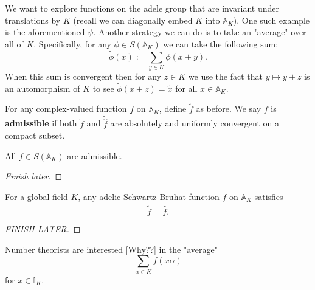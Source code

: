 \documentclass[11pt, x11names]{book}
\renewcommand{\aa}{\mathbb{A}}
\newcommand{\ii}{\mathbb{I}}
\renewcommand{\hat}{\widehat}
\begin{document}
We want to explore functions on the adele group that are invariant under translations by $K$ (recall we can diagonally embed $K$ into $\aa_K$). One such example is the aforementioned $\psi$. Another strategy we can do is to take an "average" over all of $K$. Specifically, for any $\phi \in S(\aa_K)$ we can take the following sum:
\begin{equation*}
    \widetilde{\phi}(x) := \sum_{y \in K} \phi(x + y).
\end{equation*}
When this sum is convergent then for any $z \in K$ we use the fact that $y \mapsto y + z$ is an automorphism of $K$ to see $\widetilde{\phi}(x + z) = \widetilde{x}$ for all $x \in \aa_K$.
\begin{defn}
\label{def: admissible function}
    For any complex-valued function $f$ on $\aa_K$, define $\widetilde{f}$ as before. We say $f$ is \textbf{admissible} if both $\widetilde{f}$ and $\widetilde{\hat{f}}$ are absolutely and uniformly convergent on a compact subset. 
\end{defn}

\begin{lemma}
\label{lemma: all adelic-SB-functions are admissible}
All $f \in S(\aa_K)$ are admissible.
\end{lemma}
\begin{proof}
    [Finish later]
\end{proof}

\begin{theorem}
\label{thm: Poisson Summation formula}
For a global field $K$, any adelic Schwartz-Bruhat function $f$ on $\aa_K$ satisfies
\begin{equation*}
    \widetilde{f} = \widetilde{\hat{f}}.
\end{equation*}
\end{theorem}
\begin{proof}
[FINISH LATER]
\end{proof}

Number theorists are interested [Why??] in the "average"
\begin{equation*}
    \sum_{\alpha \in K} f(x\alpha )
\end{equation*}
for $x \in \ii_K$. 
\end{document}
